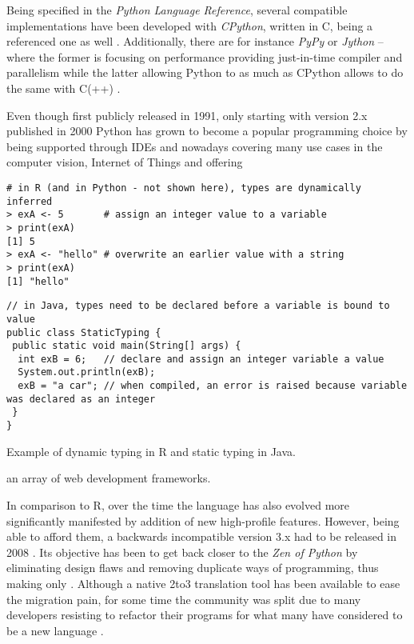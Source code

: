 Being specified in the \emph{Python Language Reference}, several compatible implementations have been developed with \emph{CPython}, written in C, being a referenced one as well \parencites{PythonCoreTeam2017Python:Language.}{PythonCoreTeam2017TheReference}.
Additionally, there are for instance \emph{PyPy} or \emph{Jython} -- where the former is focusing on performance providing just-in-time compiler and parallelism while the latter  allowing Python to  as much as CPython allows to do the same with C(++) \parencite[34]{Lutz2013}.

Even though first publicly released in 1991, only starting with version 2.x published in 2000 Python has grown to become a popular programming choice by being supported through \acp{IDE} and nowadays covering many use cases in the computer vision, Internet of Things and offering

\begin{listing}[H]
  \begin{verbatim}
# in R (and in Python - not shown here), types are dynamically inferred
> exA <- 5       # assign an integer value to a variable
> print(exA) 
[1] 5
> exA <- "hello" # overwrite an earlier value with a string 
> print(exA) 
[1] "hello"
  \end{verbatim}
  \begin{verbatim}
// in Java, types need to be declared before a variable is bound to value
public class StaticTyping {
 public static void main(String[] args) {
  int exB = 6;   // declare and assign an integer variable a value
  System.out.println(exB); 
  exB = "a car"; // when compiled, an error is raised because variable was declared as an integer
 }
}
  \end{verbatim}
\caption{Example of dynamic typing in R and static typing in Java.}
\label{lst:dynamicstatictyping}
\end{listing}

\noindent an array of web development frameworks.

In comparison to R, over the time the language has also evolved more significantly manifested by addition of new high-profile features.
However, being able to afford them, a backwards incompatible version 3.x had to be released in 2008 \parencites{GuidovanRossum2009APython}{Lutz2013}.
Its objective has been to get back closer to the \emph{Zen of Python} by eliminating design flaws and removing duplicate ways of programming, thus making only  \parencites{BerndKlein2017HistoryPython}{TimPeters2004ThePython}{Lutz2013}.
Although a native 2to3 translation tool has been available to ease the migration pain, for some time the community was split due to many developers resisting to refactor their programs for what many have considered to be a new language \parencites{Raschka2016Python:Learning}{PythonCoreTeam20172to3Translation}{Lutz2013}.

